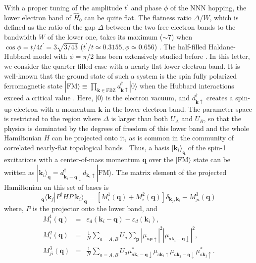 \documentclass[amsmath,superscriptaddress,showpacs,aps,prl,twocolumn]{revtex4-1}
\begin{document}
\par With a proper tuning of the amplitude $t^\prime$ and phase $\phi$ of the NNN hopping, the lower electron band of $\hat{H}_0$ can be quite flat. The flatness ratio $\Delta/W$, which is defined as the ratio of the gap $\Delta$ between the two free electron bands to the bandwidth $W$ of the lower one, takes its maximum ($\sim7$) when $\cos\phi=t/4t^\prime=3\sqrt{3/43}$ ($t^\prime/t\simeq0.3155, \phi\simeq0.656$) \cite{Neupert_PRL2011}. The half-filled Haldane-Hubbard model with $\phi=\pi/2$ has been extensively studied before \cite{He_PRB2011a,Maciejko_PRB2013,Zheng_PRB2015,Hickey_PRL2016,Wu_PRB2016,Vanhala_PRL2016,Imriska_PRB2016,Giuliani_PRB2016,Garcia_NJP2018,Gu_NJP2019}. In this letter, we consider the quarter-filled case with a nearly-flat lower electron band. It is well-known that the ground state of such a system is the spin fully polarized ferromagnetic state $|\text{FM}\rangle\equiv\prod_{\mathbf{k}\in\text{FBZ}}d^\dagger_{\mathbf{k}\uparrow}|0\rangle$ when the Hubbard interactions exceed a critical value \cite{Tasaki_PRL1994,Su_PRB2019}. Here, $|0\rangle$ is the electron vacuum, and $d^\dagger_{\mathbf{k}\uparrow}$ creates a spin-up electron with a momentum $\mathbf{k}$ in the lower electron band. The parameter space is restricted to the region where $\Delta$ is larger than both $U_A$ and $U_B$, so that the physics is dominated by the degrees of freedom of this lower band and the whole Hamiltonian $H$ can be projected onto it, as is common in the community of correlated nearly-flat topological bands \cite{Neupert_PRL2011,Regnault_PRX2011,Neupert_PRB2011,Neupert_PRL2012,Su_PRB2019}. Thus, a basis $|\mathbf{k}_i\rangle_\mathbf{q}$ of the spin-1 excitations with a center-of-mass momentum $\mathbf{q}$ over the $|\text{FM}\rangle$ state can be written as $|\mathbf{k}_i\rangle_\mathbf{q}=d^\dagger_{\mathbf{k}_i-\mathbf{q}\downarrow}d_{\mathbf{k}_i\uparrow}|\text{FM}\rangle$. The matrix element of the projected Hamiltonian on this set of bases is
\begin{equation}\label{PHP}
_\mathbf{q}\langle\mathbf{k}_j|P^\dagger HP|\mathbf{k}_i\rangle_\mathbf{q}=\left[M_{i}^1(\mathbf{q})+M_{i}^2(\mathbf{q})\right]\delta_{\mathbf{k}_j,\mathbf{k}_i}-M_{ji}^3(\mathbf{q})
\end{equation}
where, $P$ is the projector onto the lower band, and
\begin{eqnarray}
M_{i}^1(\mathbf{q}) &=& \varepsilon_d(\mathbf{k}_i-\mathbf{q})-\varepsilon_d(\mathbf{k}_i), \label{M1}\\
M_{i}^2(\mathbf{q}) &=& \frac{1}{N}\sum_{a=A,B}U_a\sum_{\mathbf{p}}\left|\mu_{a\mathbf{p}\uparrow}\right|^2\left|\mu_{a\mathbf{k}_{i}-\mathbf{q}\downarrow}\right|^2, \label{M2}\\
M_{ji}^3(\mathbf{q}) &=& \frac{1}{N}\sum_{a=A,B}U_a
\mu^{\ast}_{a\mathbf{k}_i-\mathbf{q}\downarrow}\mu_{a\mathbf{k}_{i}\uparrow}\mu_{a\mathbf{k}_j-\mathbf{q}\downarrow}\mu^{\ast}_{a\mathbf{k}_{j}\uparrow}. \label{M3}
\end{eqnarray}
\end{document}

